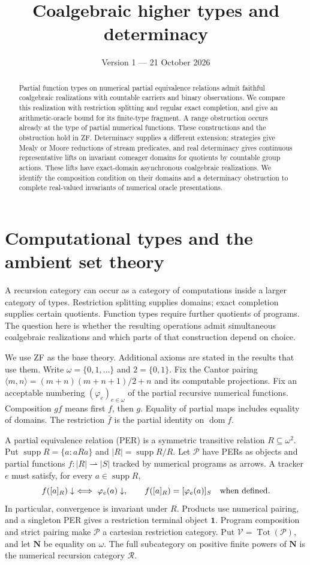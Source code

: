 \documentclass[11pt]{article}
\title{Coalgebraic higher types and determinacy}
\author{}
\date{Version 1 --- 21 October 2026}
\theoremstyle{definition}
\newcommand{\N}{\omega}
\newcommand{\Pcat}{\mathcal P}
\newcommand{\Vcat}{\mathcal V}
\newcommand{\Rcat}{\mathcal R}
\newcommand{\Tot}{\operatorname{Tot}}
\newcommand{\supp}{\operatorname{supp}}
\newcommand{\dom}{\operatorname{dom}}
\begin{document}
\maketitle
\begin{abstract}
Partial function types on numerical partial equivalence relations admit
faithful coalgebraic realizations with countable carriers and binary
observations. We compare this realization with restriction splitting and
regular exact completion, and give an arithmetic-oracle bound for its
finite-type fragment. A range obstruction occurs already at the type of
partial numerical functions. These constructions and the obstruction
hold in ZF. Determinacy supplies a different extension: strategies give
Mealy or Moore reductions of stream predicates, and real determinacy
gives continuous representative lifts on invariant comeager domains for
quotients by countable group actions. These lifts have exact-domain
asynchronous coalgebraic realizations. We identify the composition
condition on their domains and a determinacy obstruction to complete
real-valued invariants of numerical oracle presentations.
\end{abstract}

\section{Computational types and the ambient set theory}

A recursion category can occur as a category of computations inside
a larger category of types. Restriction splitting supplies domains;
exact completion supplies certain quotients. Function types require
further quotients of programs. The question here is whether the
resulting operations admit simultaneous coalgebraic realizations and
which parts of that construction depend on choice.

We use ZF as the base theory. Additional axioms are stated in the
results that use them. Write $\N=\{0,1,\ldots\}$ and
$2=\{0,1\}$. Fix the Cantor pairing
$\langle m,n\rangle=(m+n)(m+n+1)/2+n$ and its computable
projections. Fix an acceptable numbering $(\varphi_e)_{e\in\N}$
of the partial recursive numerical functions. Composition $gf$ means
first $f$, then $g$. Equality of partial maps includes equality of
domains. The restriction $\bar f$ is the partial identity on $\dom f$.

A partial equivalence relation (PER) is a symmetric transitive relation
$R\subseteq\N^2$. Put $\supp R=\{a:aRa\}$ and
$|R|=\supp R/R$. Let $\Pcat$ have PERs as objects and partial
functions $f:|R|\rightharpoonup|S|$ tracked by numerical programs
as arrows. A tracker $e$ must satisfy, for every $a\in\supp R$,
\[
 f([a]_R)\downarrow\ \Longleftrightarrow\ \varphi_e(a)\downarrow,
 \qquad
 f([a]_R)=[\varphi_e(a)]_S\quad\hbox{when defined}.
\]
In particular, convergence is invariant under $R$. Products use
numerical pairing, and a singleton PER gives a restriction terminal
object $\mathbf1$. Program composition and strict pairing make
$\Pcat$ a cartesian restriction category. Put
$\Vcat=\Tot(\Pcat)$, and let $\mathbf N$ be equality on $\N$.
The full subcategory on positive finite powers of $\mathbf N$ is the
numerical recursion category $\Rcat$.
\end{document}
